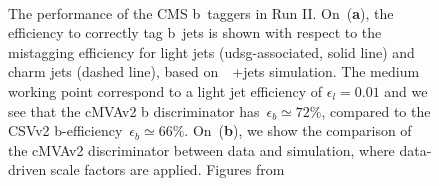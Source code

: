 \begin{figure}
\begin{centering}
 \\
\caption[The performance of the CMS b~taggers in Run II]{The performance of the CMS b~taggers in Run II. On~(\textbf{a}), the efficiency to correctly tag b~jets is shown with respect to the mistagging efficiency for light jets (udsg-associated, solid line) and charm jets (dashed line), based on~\ttbar~+jets simulation. The medium working point correspond to a light jet efficiency of $\epsilon_{l} = 0.01$ and we see that the cMVAv2 b discriminator has~$\epsilon_{b} \simeq 72\%$, compared to the CSVv2 b-efficiency~$\epsilon_{b} \simeq 66\%$. On~(\textbf{b}), we show the comparison of the cMVAv2 discriminator between data and simulation, where data-driven scale factors are applied. Figures from~\cite{CMS-PAS-BTV-15-001}}
\label{fig:btag_roc}
\end{centering}
\end{figure}


